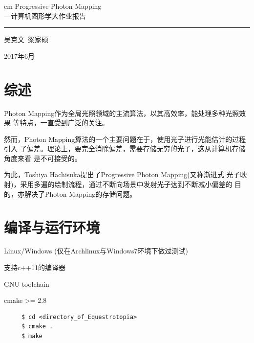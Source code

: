 \documentclass[a4paper,12pt]{article}
\theoremstyle{plain}
\numberwithin{thmdef}{section}
\begin{document}
\begin{titlepage}
    \mbox{}
     cm
    \centering
    \Huge Progressive Photon Mapping\\ \huge ---计算机图形学大作业报告

    \rule{\textwidth}{1pt}\par %

    \Large 吴克文\ 梁家硕

    \large 2017年6月
\end{titlepage}
\tableofcontents
\newpage
\section{综述}
Photon Mapping作为全局光照领域的主流算法，以其高效率，能处理多种光照效果%
等特点，一直受到广泛的关注。\par
然而，Photon Mapping算法的一个主要问题在于，使用光子进行光能估计的过程引入%
了偏差。理论上，要完全消除偏差，需要存储无穷的光子，这从计算机存储角度来看%
是不可接受的。\par
为此，Toshiya Hachisuka提出了Progressive Photon Mapping(又称渐进式%
光子映射)，采用多遍的绘制流程，通过不断向场景中发射光子达到不断减小偏差的%
目的，亦解决了Photon Mapping的存储问题。
\section{编译与运行环境}
Linux/Windows (仅在Archlinux与Windows7环境下做过测试)\par
支持c++11的编译器\par
GNU toolchain\par
cmake >= 2.8\par
\begin{verbatim}
     $ cd <directory_of_Equestrotopia>
     $ cmake .
     $ make 
\end{verbatim}
\end{document}
